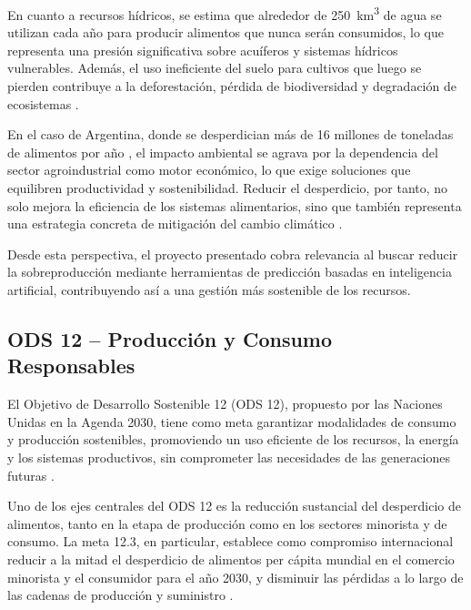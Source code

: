 En cuanto a recursos hídricos, se estima que alrededor de 250~km\textsuperscript{3} de agua se utilizan cada año para producir alimentos que nunca serán consumidos, lo que representa una presión significativa sobre acuíferos y sistemas hídricos vulnerables. Además, el uso ineficiente del suelo para cultivos que luego se pierden contribuye a la deforestación, pérdida de biodiversidad y degradación de ecosistemas \parencite{kummu2012}.

En el caso de Argentina, donde se desperdician más de 16 millones de toneladas de alimentos por año \parencite{tiscornia2022}, el impacto ambiental se agrava por la dependencia del sector agroindustrial como motor económico, lo que exige soluciones que equilibren productividad y sostenibilidad. Reducir el desperdicio, por tanto, no solo mejora la eficiencia de los sistemas alimentarios, sino que también representa una estrategia concreta de mitigación del cambio climático \parencite{unep2021}.

Desde esta perspectiva, el proyecto presentado cobra relevancia al buscar reducir la sobreproducción mediante herramientas de predicción basadas en inteligencia artificial, contribuyendo así a una gestión más sostenible de los recursos.

\subsection{ODS 12 – Producción y Consumo Responsables}

El Objetivo de Desarrollo Sostenible 12 (ODS 12), propuesto por las Naciones Unidas en la Agenda 2030, tiene como meta garantizar modalidades de consumo y producción sostenibles, promoviendo un uso eficiente de los recursos, la energía y los sistemas productivos, sin comprometer las necesidades de las generaciones futuras \parencite{onu2015}.

Uno de los ejes centrales del ODS 12 es la reducción sustancial del desperdicio de alimentos, tanto en la etapa de producción como en los sectores minorista y de consumo. La meta 12.3, en particular, establece como compromiso internacional reducir a la mitad el desperdicio de alimentos per cápita mundial en el comercio minorista y el consumidor para el año 2030, y disminuir las pérdidas a lo largo de las cadenas de producción y suministro \parencite{unep2021}.


